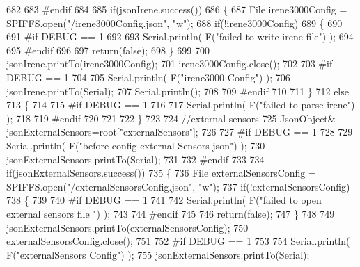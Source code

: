 \begin{DoxyCode}
682 
683 \textcolor{preprocessor}{#endif }
684 
685     \textcolor{keywordflow}{if}(jsonIrene.success())
686     \{
687         File irene3000Config = SPIFFS.open(\textcolor{stringliteral}{"/irene3000Config.json"}, \textcolor{stringliteral}{"w"});   
688         \textcolor{keywordflow}{if}(!irene3000Config)
689         \{
690 
691 \textcolor{preprocessor}{        #if DEBUG == 1 }
692 
693             Serial.println( F(\textcolor{stringliteral}{"failed to write irene file"}) );
694         
695 \textcolor{preprocessor}{        #endif}
696 
697             \textcolor{keywordflow}{return}(\textcolor{keyword}{false});
698         \}
699 
700         jsonIrene.printTo(irene3000Config);
701         irene3000Config.close();
702     
703 \textcolor{preprocessor}{    #if DEBUG == 1 }
704         
705         Serial.println( F(\textcolor{stringliteral}{"irene3000 Config"}) );
706         jsonIrene.printTo(Serial);
707         Serial.println();
708     
709 \textcolor{preprocessor}{    #endif}
710     
711     \}
712     \textcolor{keywordflow}{else}
713     \{
714     
715 \textcolor{preprocessor}{    #if DEBUG == 1 }
716 
717         Serial.println( F(\textcolor{stringliteral}{"failed to parse irene"}) );   
718     
719 \textcolor{preprocessor}{    #endif }
720 
721 
722     \}
723     
724     \textcolor{comment}{//external sensors}
725         JsonObject& jsonExternalSensors=root[\textcolor{stringliteral}{"externalSensors"}];
726 
727 \textcolor{preprocessor}{#if DEBUG == 1 }
728 
729     Serial.println( F(\textcolor{stringliteral}{"before config external Sensors json"}) );
730     jsonExternalSensors.printTo(Serial);
731 
732 \textcolor{preprocessor}{#endif}
733 
734     \textcolor{keywordflow}{if}(jsonExternalSensors.success())
735     \{
736         File externalSensorsConfig = SPIFFS.open(\textcolor{stringliteral}{"/externalSensorsConfig.json"}, \textcolor{stringliteral}{"w"});   
737         \textcolor{keywordflow}{if}(!externalSensorsConfig)
738         \{
739         
740 \textcolor{preprocessor}{        #if DEBUG == 1 }
741 
742             Serial.println( F(\textcolor{stringliteral}{"failed to open external sensors file "}) );
743         
744 \textcolor{preprocessor}{        #endif }
745 
746             \textcolor{keywordflow}{return}(\textcolor{keyword}{false});
747         \}
748 
749         jsonExternalSensors.printTo(externalSensorsConfig); 
750         externalSensorsConfig.close();
751 
752 \textcolor{preprocessor}{#if DEBUG == 1 }
753         
754         Serial.println( F(\textcolor{stringliteral}{"externalSensors Config"}) );
755         jsonExternalSensors.printTo(Serial);

\end{DoxyCode}
